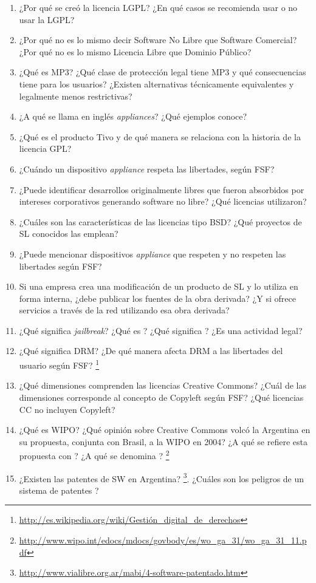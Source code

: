 \begin{enumerate}
	\item ¿Por qué se creó la licencia LGPL? ¿En qué casos se recomienda usar o no usar la LGPL?
	\item ¿Por qué no es lo mismo decir Software No Libre que Software Comercial? ¿Por qué no es lo mismo Licencia Libre que Dominio Público? 
	\item ¿Qué es MP3? ¿Qué clase de protección legal tiene MP3 y qué consecuencias tiene para los usuarios? ¿Existen alternativas técnicamente equivalentes y legalmente menos restrictivas?
	\item ¿A qué se llama en inglés \emph{appliances}? ¿Qué ejemplos conoce? 
	\item ¿Qué es el producto Tivo y de qué manera se relaciona con la historia de la licencia GPL?
	\item ¿Cuándo un dispositivo \emph{appliance} respeta las libertades, según FSF?
	\item ¿Puede identificar desarrollos originalmente libres que fueron absorbidos por intereses corporativos generando software no libre? ¿Qué licencias utilizaron?
\item ¿Cuáles son las características de las licencias tipo BSD? ¿Qué proyectos de SL conocidos las emplean?
	\item ¿Puede mencionar dispositivos \emph{appliance} que respeten y no respeten las libertades según FSF?
	\item Si una empresa crea una modificación de un producto de SL y lo utiliza en forma interna, ¿debe publicar los fuentes de la obra derivada? ¿Y si ofrece servicios a través de la red utilizando esa obra derivada?
	\item ¿Qué significa \emph{jailbreak}? ¿Qué es ? ¿Qué significa ? ¿Es una actividad legal? 
	\item ¿Qué significa DRM? ¿De qué manera afecta DRM a las libertades del usuario según FSF? \footnote{\url{http://es.wikipedia.org/wiki/Gestión_digital_de_derechos}}

	\item ¿Qué dimensiones comprenden las licencias Creative Commons? ¿Cuál de las dimensiones corresponde al concepto de Copyleft según FSF? ¿Qué licencias CC no incluyen Copyleft?

\item ¿Qué es WIPO? ¿Qué opinión sobre Creative Commons volcó la Argentina en su propuesta, conjunta con Brasil, a la WIPO en 2004? ¿A qué se refiere esta propuesta con ? ¿A qué se denomina ? \footnote{\url{http://www.wipo.int/edocs/mdocs/govbody/es/wo_ga_31/wo_ga_31_11.pdf}}

\item ¿Existen las patentes de SW en Argentina? \footnote{\url{http://www.vialibre.org.ar/mabi/4-software-patentado.htm}}.
¿Cuáles son los peligros de un sistema de patentes ?

\end{enumerate}

